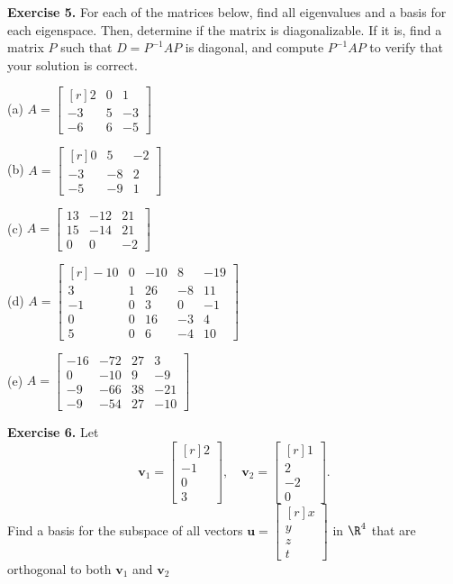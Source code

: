\documentclass[12pt]{article}
\begin{document}
\bigskip
\textbf{Exercise 5.} For each of the matrices below, find all eigenvalues and a basis for each eigenspace. Then, determine if the matrix is diagonalizable. If it is, find a matrix $P$ such that $D=P^{-1}AP$ is diagonal, and compute $P^{-1}AP$ to verify that your solution is correct.

\medskip
(a) $A=\left[\begin{matrix*}[r]2 & 0 & 1\\-3 & 5 & -3\\-6 & 6 & -5\end{matrix*}\right]$

\medskip
(b) $A=\left[\begin{matrix*}[r]0 & 5 & -2\\-3 & -8 & 2\\-5 & -9 & 1\end{matrix*}\right]$

\medskip
(c) $A=\left[\begin{matrix}13 & -12 & 21\\15 & -14 & 21\\0 & 0 & -2\end{matrix}\right]$

\medskip
(d) $A=\left[\begin{matrix*}[r]-10 & 0 & -10 & 8 & -19\\3 & 1 & 26 & -8 & 11\\-1 & 0 & 3 & 0 & -1\\0 & 0 & 16 & -3 & 4\\5 & 0 & 6 & -4 & 10\end{matrix*}\right]$

\medskip
(e) $A=\left[\begin{matrix}-16 & -72 & 27 & 3\\0 & -10 & 9 & -9\\-9 & -66 & 38 & -21\\-9 & -54 & 27 & -10\end{matrix}\right]$

\bigskip
\textbf{Exercise 6.} Let
\[
\mathbf{v}_1=\begin{bmatrix*}[r]2\\-1\\0\\3\end{bmatrix*},\quad
\mathbf{v}_2=\begin{bmatrix*}[r]1\\2\\-2\\0\end{bmatrix*}.
\]
Find a basis for the subspace of all vectors $\mathbf{u}=\begin{bmatrix*}[r]x\\y\\z\\t\end{bmatrix*}$ in $\R^4$ that are orthogonal to both $\mathbf{v}_1$ and $\mathbf{v}_2$
\end{document}
